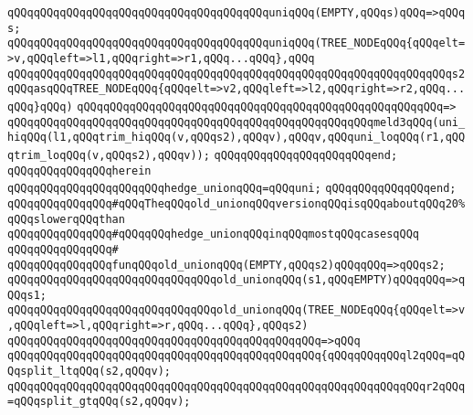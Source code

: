 \verb|qQQqqQQqqQQqqQQqqQQqqQQqqQQqqQQqqQQqqQQquniqQQq(EMPTY,qQQqs)qQQq=>qQQqs;|\newline
\newline
\verb|qQQqqQQqqQQqqQQqqQQqqQQqqQQqqQQqqQQqqQQquniqQQq(TREE_NODEqQQq{qQQqelt=>v,qQQqleft=>l1,qQQqright=>r1,qQQq...qQQq},qQQq|\newline
\verb|qQQqqQQqqQQqqQQqqQQqqQQqqQQqqQQqqQQqqQQqqQQqqQQqqQQqqQQqqQQqqQQqqQQqs2qQQqasqQQqTREE_NODEqQQq{qQQqelt=>v2,qQQqleft=>l2,qQQqright=>r2,qQQq...qQQq}qQQq)|\newline
\verb|qQQqqQQqqQQqqQQqqQQqqQQqqQQqqQQqqQQqqQQqqQQqqQQqqQQqqQQq=>|\newline
\verb|qQQqqQQqqQQqqQQqqQQqqQQqqQQqqQQqqQQqqQQqqQQqqQQqqQQqqQQqmeld3qQQq(uni_hiqQQq(l1,qQQqtrim_hiqQQq(v,qQQqs2),qQQqv),qQQqv,qQQquni_loqQQq(r1,qQQqtrim_loqQQq(v,qQQqs2),qQQqv));|\newline
\verb|qQQqqQQqqQQqqQQqqQQqqQQqend;|\newline
\newline
\verb|qQQqqQQqqQQqqQQqherein|\newline
\verb|qQQqqQQqqQQqqQQqqQQqqQQqhedge_unionqQQq=qQQquni;|\newline
\verb|qQQqqQQqqQQqqQQqend;|\newline
\newline
\verb|qQQqqQQqqQQqqQQq#qQQqTheqQQqold_unionqQQqversionqQQqisqQQqaboutqQQq20%qQQqslowerqQQqthan|\newline
\verb|qQQqqQQqqQQqqQQq#qQQqqQQqhedge_unionqQQqinqQQqmostqQQqcasesqQQq|\newline
\verb|qQQqqQQqqQQqqQQq#|\newline
\verb|qQQqqQQqqQQqqQQqfunqQQqold_unionqQQq(EMPTY,qQQqs2)qQQqqQQq=>qQQqs2;|\newline
\verb|qQQqqQQqqQQqqQQqqQQqqQQqqQQqqQQqold_unionqQQq(s1,qQQqEMPTY)qQQqqQQq=>qQQqs1;|\newline
\newline
\verb|qQQqqQQqqQQqqQQqqQQqqQQqqQQqqQQqold_unionqQQq(TREE_NODEqQQq{qQQqelt=>v,qQQqleft=>l,qQQqright=>r,qQQq...qQQq},qQQqs2)|\newline
\verb|qQQqqQQqqQQqqQQqqQQqqQQqqQQqqQQqqQQqqQQqqQQqqQQq=>qQQq|\newline
\verb|qQQqqQQqqQQqqQQqqQQqqQQqqQQqqQQqqQQqqQQqqQQqqQQq{qQQqqQQqqQQql2qQQq=qQQqsplit_ltqQQq(s2,qQQqv);|\newline
\verb|qQQqqQQqqQQqqQQqqQQqqQQqqQQqqQQqqQQqqQQqqQQqqQQqqQQqqQQqqQQqqQQqr2qQQq=qQQqsplit_gtqQQq(s2,qQQqv);|\newline
\newline
